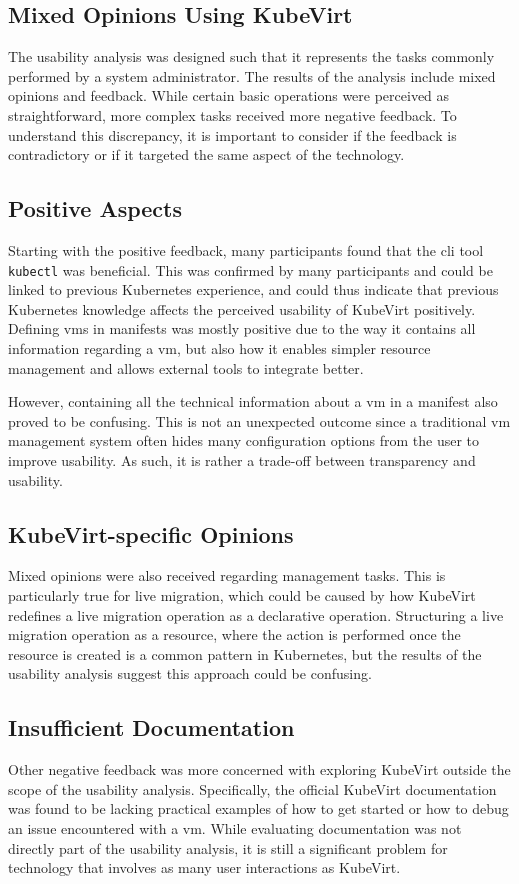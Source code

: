 \documentclass{kththesis}
\begin{document}
\begin{enumerate}
\section{Mixed Opinions Using KubeVirt}
The usability analysis was designed such that it represents the tasks commonly performed by a system administrator. The results of the analysis include mixed opinions and feedback. While certain basic operations were perceived as straightforward, more complex tasks received more negative feedback. To understand this discrepancy, it is important to consider if the feedback is contradictory or if it targeted the same aspect of the technology. 

\subsection{Positive Aspects}
Starting with the positive feedback, many participants found that the \Gls{cli} tool \texttt{kubectl} was beneficial. This was confirmed by many participants and could be linked to previous Kubernetes experience, and could thus indicate that previous Kubernetes knowledge affects the perceived usability of KubeVirt positively. Defining \Glspl{vm} in manifests was mostly positive due to the way it contains all information regarding a \Gls{vm}, but also how it enables simpler resource management and allows external tools to integrate better. 

However, containing all the technical information about a \Gls{vm} in a manifest also proved to be confusing. This is not an unexpected outcome since a traditional \Gls{vm} management system often hides many configuration options from the user to improve usability. As such, it is rather a trade-off between transparency and usability. 

\subsection{KubeVirt-specific Opinions}
Mixed opinions were also received regarding management tasks. This is particularly true for live migration, which could be caused by how KubeVirt redefines a live migration operation as a declarative operation. Structuring a live migration operation as a resource, where the action is performed once the resource is created is a common pattern in Kubernetes, but the results of the usability analysis suggest this approach could be confusing.

\subsection{Insufficient Documentation}
Other negative feedback was more concerned with exploring KubeVirt outside the scope of the usability analysis. Specifically, the official KubeVirt documentation was found to be lacking practical examples of how to get started or how to debug an issue encountered with a \Gls{vm}. While evaluating documentation was not directly part of the usability analysis, it is still a significant problem for technology that involves as many user interactions as KubeVirt. 


\end{enumerate}
\end{document}
